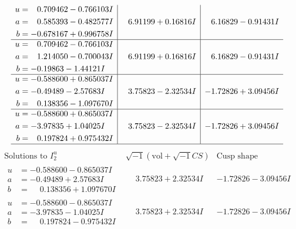 \documentclass[1p]{elsarticle_modified}
\theoremstyle{definition}
\newcommand{\I}{\sqrt{-1}}
\begin{document}
$$\begin{array}{c|c|c}
\begin{aligned}
u &= \phantom{-}0.709462 - 0.766103 I \\
a &= \phantom{-}0.585393 - 0.482577 I \\
b &= -0.678167 + 0.996758 I\end{aligned}
 & \phantom{-}6.91199 + 0.16816 I & \phantom{-}6.16829 - 0.91431 I \\ \hline\begin{aligned}
u &= \phantom{-}0.709462 - 0.766103 I \\
a &= \phantom{-}1.214050 - 0.700043 I \\
b &= -0.19863 - 1.44121 I\end{aligned}
 & \phantom{-}6.91199 + 0.16816 I & \phantom{-}6.16829 - 0.91431 I \\ \hline\begin{aligned}
u &= -0.588600 + 0.865037 I \\
a &= -0.49489 - 2.57683 I \\
b &= \phantom{-}0.138356 - 1.097670 I\end{aligned}
 & \phantom{-}3.75823 - 2.32534 I & -1.72826 + 3.09456 I \\ \hline\begin{aligned}
u &= -0.588600 + 0.865037 I \\
a &= -3.97835 + 1.04025 I \\
b &= \phantom{-}0.197824 + 0.975432 I\end{aligned}
 & \phantom{-}3.75823 - 2.32534 I & -1.72826 + 3.09456 I\\
 \hline 
 \end{array}$$\newpage$$\begin{array}{c|c|c}  
\text{Solutions to }I^u_{2}& \I (\text{vol} + \sqrt{-1}CS) & \text{Cusp shape}\\
 \hline 
\begin{aligned}
u &= -0.588600 - 0.865037 I \\
a &= -0.49489 + 2.57683 I \\
b &= \phantom{-}0.138356 + 1.097670 I\end{aligned}
 & \phantom{-}3.75823 + 2.32534 I & -1.72826 - 3.09456 I \\ \hline\begin{aligned}
u &= -0.588600 - 0.865037 I \\
a &= -3.97835 - 1.04025 I \\
b &= \phantom{-}0.197824 - 0.975432 I\end{aligned}
 & \phantom{-}3.75823 + 2.32534 I & -1.72826 - 3.09456 I \\ \hline\begin{aligned}

\end{aligned}
\end{array}$$
\end{document}

